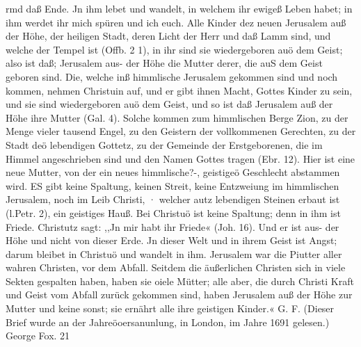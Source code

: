 rmd daß Ende. Jn ihm lebet und wandelt, in welchem ihr
ewigeß Leben habet; in ihm werdet ihr mich spüren und ich euch.
Alle Kinder dez neuen Jerusalem auß der Höhe, der heiligen
Stadt, deren Licht der Herr und daß Lamm sind, und welche der
Tempel ist (Offb. 2 1), in ihr sind sie wiedergeboren auö dem
Geist; also ist daß; Jerusalem aus- der Höhe die Mutter derer,
die auS dem Geist geboren sind. Die, welche inß himmlische
Jerusalem gekommen sind und noch kommen, nehmen Christuin
auf, und er gibt ihnen Macht, Gottes Kinder zu sein, und sie sind
wiedergeboren auö dem Geist, und so ist daß Jerusalem auß der
Höhe ihre Mutter (Gal. 4). Solche kommen zum himmlischen
Berge Zion, zu der Menge vieler tausend Engel, zu den Geistern
der vollkommenen Gerechten, zu der Stadt deö lebendigen Gottetz,
zu der Gemeinde der Erstgeborenen, die im Himmel angeschrieben
sind und den Namen Gottes tragen (Ebr. 12). Hier ist eine
neue Mutter, von der ein neues himmlische?-, geistigeö Geschlecht
abstammen wird. ES gibt keine Spaltung, keinen Streit, keine
Entzweiung im himmlischen Jerusalem, noch im Leib Christi,
· welcher autz lebendigen Steinen erbaut ist (l.Petr. 2), ein geistiges
Hauß. Bei Christuö ist keine Spaltung; denn in ihm ist Friede.
Christutz sagt: ,,Jn mir habt ihr Friede« (Joh. 16). Und er ist
aus- der Höhe und nicht von dieser Erde. Jn dieser Welt und
in ihrem Geist ist Angst; darum bleibet in Christuö und wandelt
in ihm.
Jerusalem war die Piutter aller wahren Christen, vor dem
Abfall. Seitdem die äußerlichen Christen sich in viele Sekten
gespalten haben, haben sie oiele Mütter; alle aber, die durch
Christi Kraft und Geist vom Abfall zurück gekommen sind, haben
Jerusalem auß der Höhe zur Mutter und keine sonst; sie ernährt
alle ihre geistigen Kinder.« G. F.
(Dieser Brief wurde an der Jahreöoersanunlung, in London,
im Jahre 1691 gelesen.)
George Fox. 21




